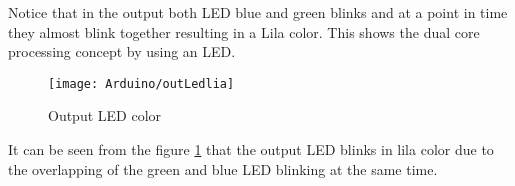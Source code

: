 Notice that in the output both LED blue and green blinks and at a point in time they almost blink together resulting in a Lila color. This shows the dual core processing concept by using an LED.

\begin{figure}[H]
	\centering
	\texttt{[image: Arduino/outLedlia]}
	\caption{Output LED color}
	\label{figure 5.7}
\end{figure}
It can be seen from the figure \ref{figure 5.7} that the output LED blinks in lila color due to the overlapping of the green and blue LED blinking at the same time.
